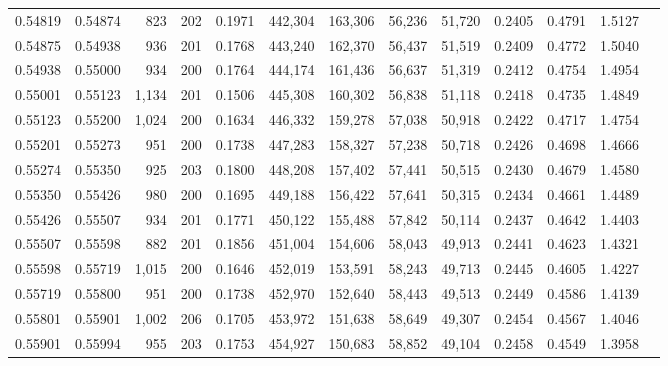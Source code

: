 \begin{tabular}{rrrrrrrrrrrrr}
0.54819 & 0.54874 &   823 & 202 &                                     0.1971 & 442,304 & 163,306 &  56,236 &  51,720 & 0.2405 & 0.4791 & 1.5127 \\
0.54875 & 0.54938 &   936 & 201 &                                     0.1768 & 443,240 & 162,370 &  56,437 &  51,519 & 0.2409 & 0.4772 & 1.5040 \\
0.54938 & 0.55000 &   934 & 200 &                                     0.1764 & 444,174 & 161,436 &  56,637 &  51,319 & 0.2412 & 0.4754 & 1.4954 \\
0.55001 & 0.55123 & 1,134 & 201 &                                     0.1506 & 445,308 & 160,302 &  56,838 &  51,118 & 0.2418 & 0.4735 & 1.4849 \\
0.55123 & 0.55200 & 1,024 & 200 &                                     0.1634 & 446,332 & 159,278 &  57,038 &  50,918 & 0.2422 & 0.4717 & 1.4754 \\
0.55201 & 0.55273 &   951 & 200 &                                     0.1738 & 447,283 & 158,327 &  57,238 &  50,718 & 0.2426 & 0.4698 & 1.4666 \\
0.55274 & 0.55350 &   925 & 203 &                                     0.1800 & 448,208 & 157,402 &  57,441 &  50,515 & 0.2430 & 0.4679 & 1.4580 \\
0.55350 & 0.55426 &   980 & 200 &                                     0.1695 & 449,188 & 156,422 &  57,641 &  50,315 & 0.2434 & 0.4661 & 1.4489 \\
0.55426 & 0.55507 &   934 & 201 &                                     0.1771 & 450,122 & 155,488 &  57,842 &  50,114 & 0.2437 & 0.4642 & 1.4403 \\
0.55507 & 0.55598 &   882 & 201 &                                     0.1856 & 451,004 & 154,606 &  58,043 &  49,913 & 0.2441 & 0.4623 & 1.4321 \\
0.55598 & 0.55719 & 1,015 & 200 &                                     0.1646 & 452,019 & 153,591 &  58,243 &  49,713 & 0.2445 & 0.4605 & 1.4227 \\
0.55719 & 0.55800 &   951 & 200 &                                     0.1738 & 452,970 & 152,640 &  58,443 &  49,513 & 0.2449 & 0.4586 & 1.4139 \\
0.55801 & 0.55901 & 1,002 & 206 &                                     0.1705 & 453,972 & 151,638 &  58,649 &  49,307 & 0.2454 & 0.4567 & 1.4046 \\
0.55901 & 0.55994 &   955 & 203 &                                     0.1753 & 454,927 & 150,683 &  58,852 &  49,104 & 0.2458 & 0.4549 & 1.3958 \\

\end{tabular}
